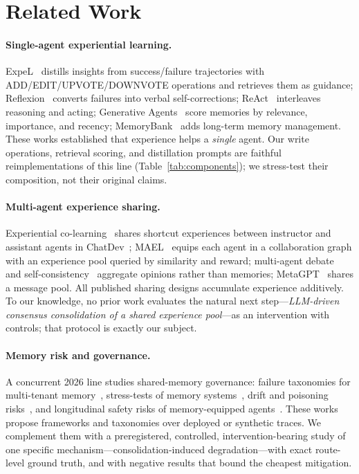 \documentclass[11pt]{article}
\begin{document}
\section{Related Work}

\paragraph{Single-agent experiential learning.} ExpeL~\citep{zhao2024expel} distills insights
from success/failure trajectories with ADD/EDIT/UPVOTE/DOWNVOTE operations and retrieves them
as guidance; Reflexion~\citep{shinn2023reflexion} converts failures into verbal
self-corrections; ReAct~\citep{yao2023react} interleaves reasoning and acting;
Generative Agents~\citep{park2023generative} score memories by relevance, importance, and
recency; MemoryBank~\citep{zhong2024memorybank} adds long-term memory management. These works
established that experience helps a \emph{single} agent. Our write operations, retrieval
scoring, and distillation prompts are faithful reimplementations of this line
(Table~\ref{tab:components}); we stress-test their composition, not their original claims.

\paragraph{Multi-agent experience sharing.} Experiential
co-learning~\citep{qian2024colearning} shares shortcut experiences between instructor and
assistant agents in ChatDev~\citep{qian2024chatdev}; MAEL~\citep{liu2025mael} equips each agent
in a collaboration graph with an experience pool queried by similarity and reward;
multi-agent debate~\citep{du2024debate} and self-consistency~\citep{wang2023selfconsistency}
aggregate opinions rather than memories; MetaGPT~\citep{hong2024metagpt} shares a message pool.
All published sharing designs accumulate experience additively. To our knowledge, no prior
work evaluates the natural next step---\emph{LLM-driven consensus consolidation of a shared
experience pool}---as an intervention with controls; that protocol is exactly our subject.

\paragraph{Memory risk and governance.} A concurrent 2026 line studies shared-memory
governance: failure taxonomies for multi-tenant memory~\citep{governed2026sharedmem},
stress-tests of memory systems~\citep{memfail2026}, drift and poisoning
risks~\citep{ssgm2026}, and longitudinal safety risks of memory-equipped
agents~\citep{remembering2026}. These works propose frameworks and taxonomies over deployed
or synthetic traces. We complement them with a preregistered, controlled, intervention-bearing
study of one specific mechanism---consolidation-induced degradation---with exact route-level
ground truth, and with negative results that bound the cheapest mitigation.
\end{document}

